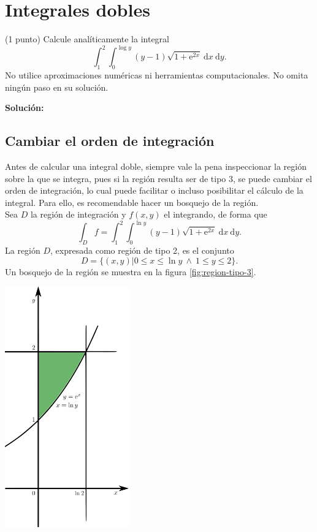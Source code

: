 \documentclass{fmbvecto}
\begin{document}
\section{Integrales dobles}

\begin{problema}
    
    (1 punto) Calcule analíticamente la integral \[ \int_{1}^{2} \int_{0}^{\log y} (y-1) \sqrt{1 + \mathrm{e}^{2x}} \: \mathrm{d}x \: \mathrm{d}y. \] No utilice aproximaciones numéricas ni herramientas computacionales. No omita ningún paso en su solución.

\tcblower
\textbf{Solución:}

    \subsection{Cambiar el orden de integración}

    Antes de calcular una integral doble, siempre vale la pena inspeccionar la región sobre la que se integra, pues si la región resulta ser de tipo 3, se puede cambiar el orden de integración, lo cual puede facilitar o incluso posibilitar el cálculo de la integral. Para ello, es recomendable hacer un bosquejo de la región. \\
    
    Sea \(D\) la región de integración y \(f(x, y)\) el integrando, de forma que \[ \int_D f = \int_{1}^{2} \int_{0}^{\ln y} (y-1) \sqrt{1 + \mathrm{e}^{2x}} \: \mathrm{d}x \: \mathrm{d}y. \]
    La región \(D\), expresada como región de tipo 2, es el conjunto
    \[D = \{(x, y) | 0 \leq x \leq \ln y \ \land \ 1 \leq y \leq 2\}.\]
    Un bosquejo de la región se muestra en la figura \ref{fig:region-tipo-3}.

    \begin{center}
        \includegraphics[width=0.4\textwidth]{region-tipo-3.png}
        \label{fig:region-tipo-3}
    \end{center}


\end{problema}
\end{document}
